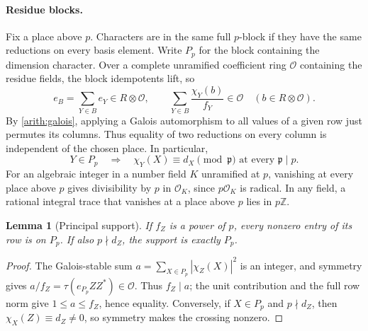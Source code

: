 \documentclass[11pt,a4paper]{article}
\numberwithin{equation}{section}
\newtheorem{lemma}[theorem]{Lemma}
\begin{document}
\paragraph{Residue blocks.}
Fix a place above $p$. Characters are in the same full $p$-block if
they have the same reductions on every basis element. Write $P_p$
for the block containing the dimension character. Over a complete
unramified coefficient ring $\mathcal O$ containing the residue
fields, the block idempotents lift, so
\begin{equation}\label{arith:local-blocks}
 e_B=\sum_{Y\in B}e_Y\in R\otimes\mathcal O,
 \qquad \sum_{Y\in B}\frac{\chi_Y(b)}{f_Y}\in\mathcal O
       \quad(b\in R\otimes\mathcal O).
\end{equation}
By \eqref{arith:galois}, applying a Galois automorphism to
all values of a given row just permutes its columns. Thus equality
of two reductions on every column is independent of the chosen place.
In particular,
\begin{equation}\label{arith:all-places}
       Y\in P_p\quad\Longrightarrow\quad
       \chi_Y(X)\equiv d_X\pmod{\mathfrak p}
       \text{ at every }\mathfrak p\mid p.
\end{equation}
For an algebraic integer in a number field $K$ unramified at $p$,
vanishing at every place above $p$ gives divisibility by $p$ in
$\mathcal O_K$, since $p\mathcal O_K$ is radical. In any field,
a rational integral trace that vanishes at a place above $p$ lies in
$p\mathbb Z$.

\begin{lemma}[Principal support]\label{arith:principal-support}
If $f_Z$ is a power of $p$, every nonzero entry of its row is on
$P_p$. If also $p\nmid d_Z$, the support is exactly $P_p$.
\end{lemma}
\begin{proof}
The Galois-stable sum $a=\sum_{X\in P_p}|\chi_Z(X)|^2$ is an
integer, and symmetry gives $a/f_Z=\tau(e_{P_p}ZZ^*)\in\mathcal O$.
Thus $f_Z\mid a$; the unit contribution and the full row norm give
$1\le a\le f_Z$, hence equality. Conversely, if $X\in P_p$ and
$p\nmid d_Z$, then $\chi_X(Z)\equiv d_Z\ne0$, so symmetry makes
the crossing nonzero.
\end{proof}
\end{document}
